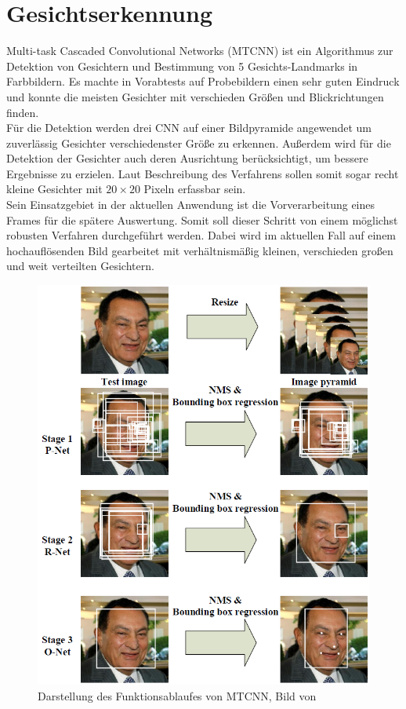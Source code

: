 \section{Gesichtserkennung}
\label{MTCNN}
Multi-task Cascaded Convolutional Networks (MTCNN) ist ein Algorithmus zur Detektion von Gesichtern und Bestimmung von 5 Gesichts-Landmarks in Farbbildern. Es machte in Vorabtests auf Probebildern einen sehr guten Eindruck und konnte die meisten Gesichter mit verschieden Größen und Blickrichtungen finden.\\
Für die Detektion werden drei CNN auf einer Bildpyramide angewendet um zuverlässig Gesichter verschiedenster Größe zu erkennen. Außerdem wird für die Detektion der Gesichter auch deren Ausrichtung berücksichtigt, um bessere Ergebnisse zu erzielen. Laut Beschreibung des Verfahrens sollen somit sogar recht kleine Gesichter mit $20\times 20$ Pixeln erfassbar sein.\\
Sein Einsatzgebiet in der aktuellen Anwendung ist die Vorverarbeitung eines Frames für die spätere Auswertung. Somit soll dieser Schritt von einem möglichst robusten Verfahren durchgeführt werden.
\newpage Dabei wird im aktuellen Fall auf einem hochauflösenden Bild gearbeitet mit verhältnismäßig kleinen, verschieden großen und weit verteilten Gesichtern.
\begin{figure}
	\centering
	\includegraphics[width=0.7\linewidth]{img/MTCNN_Step}
	\caption{Darstellung des Funktionsablaufes von MTCNN, Bild von \cite{MTCCN}}
	\label{img_MTCNN_Step}
\end{figure}
